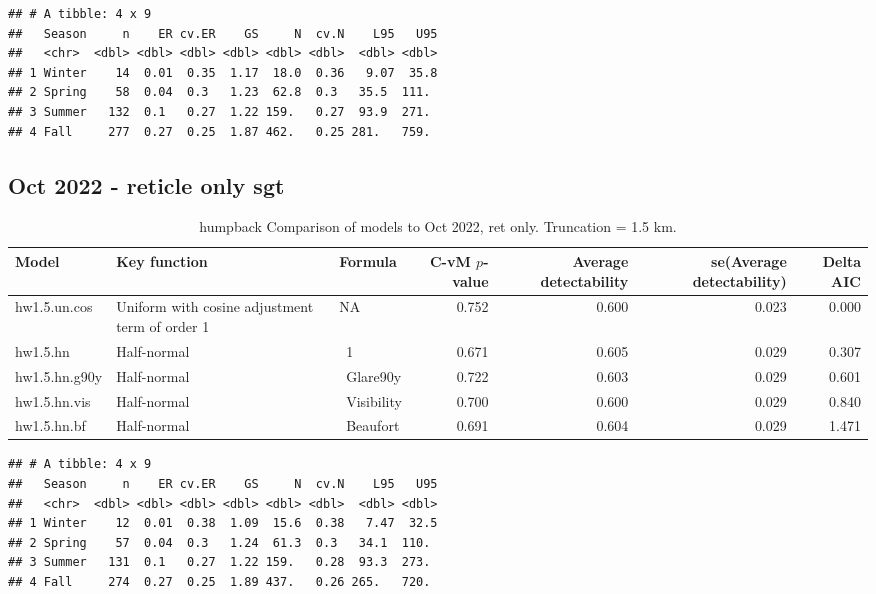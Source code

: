 \documentclass[
]{article}
\begin{document}
\begin{verbatim}
## # A tibble: 4 x 9
##   Season     n    ER cv.ER    GS     N  cv.N    L95   U95
##   <chr>  <dbl> <dbl> <dbl> <dbl> <dbl> <dbl>  <dbl> <dbl>
## 1 Winter    14  0.01  0.35  1.17  18.0  0.36   9.07  35.8
## 2 Spring    58  0.04  0.3   1.23  62.8  0.3   35.5  111. 
## 3 Summer   132  0.1   0.27  1.22 159.   0.27  93.9  271. 
## 4 Fall     277  0.27  0.25  1.87 462.   0.25 281.   759.
\end{verbatim}

\hypertarget{oct-2022---reticle-only-sgt}{%
\subsection{Oct 2022 - reticle only
sgt}\label{oct-2022---reticle-only-sgt}}

\begin{landscape}\begin{table}

\caption{\label{tab:oct-ret}humpback  Comparison of models to Oct 2022, ret only. Truncation = 1.5 km.}
\centering
\begin{tabular}[t]{l|l|l|r|r|r|r}
\hline
Model & Key function & Formula & C-vM $p$-value & Average detectability & se(Average detectability) & Delta AIC\\
\hline
hw1.5.un.cos & Uniform with cosine adjustment term of order 1 & NA & 0.752 & 0.600 & 0.023 & 0.000\\
\hline
hw1.5.hn & Half-normal & ~1 & 0.671 & 0.605 & 0.029 & 0.307\\
\hline
hw1.5.hn.g90y & Half-normal & ~Glare90y & 0.722 & 0.603 & 0.029 & 0.601\\
\hline
hw1.5.hn.vis & Half-normal & ~Visibility & 0.700 & 0.600 & 0.029 & 0.840\\
\hline
hw1.5.hn.bf & Half-normal & ~Beaufort & 0.691 & 0.604 & 0.029 & 1.471\\
\hline
\end{tabular}
\end{table}
\end{landscape}

\begin{verbatim}
## # A tibble: 4 x 9
##   Season     n    ER cv.ER    GS     N  cv.N    L95   U95
##   <chr>  <dbl> <dbl> <dbl> <dbl> <dbl> <dbl>  <dbl> <dbl>
## 1 Winter    12  0.01  0.38  1.09  15.6  0.38   7.47  32.5
## 2 Spring    57  0.04  0.3   1.24  61.3  0.3   34.1  110. 
## 3 Summer   131  0.1   0.27  1.22 159.   0.28  93.3  273. 
## 4 Fall     274  0.27  0.25  1.89 437.   0.26 265.   720.
\end{verbatim}
\end{document}
